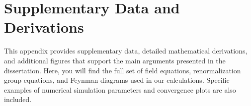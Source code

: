 \chapter{Supplementary Data and Derivations}
\label{chap:appendix-a}
This appendix provides supplementary data, detailed mathematical derivations, and additional figures that support the main arguments presented in the dissertation. Here, you will find the full set of field equations, renormalization group equations, and Feynman diagrams used in our calculations. Specific examples of numerical simulation parameters and convergence plots are also included.
\blindtext[2] %
